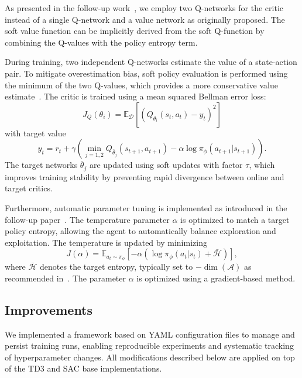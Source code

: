 As presented in the follow-up work~\cite{haarnoja2018algorithms}, we employ two Q-networks for
the critic instead of a single Q-network and a value network as originally proposed.
The soft value function can be implicitly derived from the soft Q-function by combining the
Q-values with the policy entropy term.

During training, two independent Q-networks estimate the value of a state-action pair.
To mitigate overestimation bias, soft policy evaluation is performed using the minimum of the two
Q-values, which provides a more conservative value estimate~\cite{fujimoto2018:TD3}.
The critic is trained using a mean squared Bellman error loss:
\begin{equation}
  J_Q(\theta_i) = \mathbb{E}_{\mathcal{D}}\!\left[
    \left(Q_{\theta_i}(s_t,a_t) - y_t\right)^2
  \right]
\end{equation}
with target value
\begin{equation}
  y_t = r_t + \gamma\!\left(
    \min_{j=1,2} Q_{\bar{\theta}_j}(s_{t+1},a_{t+1})
    - \alpha \log \pi_\phi(a_{t+1}|s_{t+1})
  \right).
\end{equation}
The target networks $\bar{\theta}_j$ are updated using soft updates with factor $\tau$, which
improves training stability by preventing rapid divergence between online and target critics.

Furthermore, automatic parameter tuning is implemented as introduced in the follow-up
paper~\cite{haarnoja2018algorithms}.
The temperature parameter $\alpha$ is optimized to match a target policy entropy, allowing the
agent to automatically balance exploration and exploitation.
The temperature is updated by minimizing
\begin{equation}
  J(\alpha) = \mathbb{E}_{a_t \sim \pi_\phi}\!\left[
    -\alpha\left(\log \pi_\phi(a_t|s_t) + \bar{\mathcal{H}}\right)
  \right],
\end{equation}
where $\bar{\mathcal{H}}$ denotes the target entropy, typically set to
$-\operatorname{dim}(\mathcal{A})$ as recommended in~\cite{haarnoja2018algorithms}.
The parameter $\alpha$ is optimized using a gradient-based method.




\subsection{Improvements}
\label{sec:improvements}

We implemented a framework based on YAML configuration files to manage and persist training runs,
enabling reproducible experiments and systematic tracking of hyperparameter changes.
All modifications described below are applied on top of the \ac{TD3} and \ac{SAC} base implementations.

